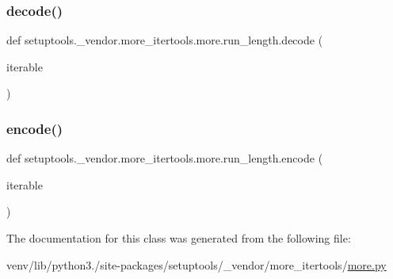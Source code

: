 \subsubsection{\texorpdfstring{decode()}{decode()}}
{\footnotesize\ttfamily def setuptools.\+\_\+vendor.\+more\+\_\+itertools.\+more.\+run\+\_\+length.\+decode (\begin{DoxyParamCaption}\item[{}]{iterable }\end{DoxyParamCaption})\hspace{0.3cm}{\ttfamily [static]}}

\mbox{\label{classsetuptools_1_1__vendor_1_1more__itertools_1_1more_1_1run__length_a4046f1d68dbcb52ce9caa17fb2d356cd}} 
\subsubsection{\texorpdfstring{encode()}{encode()}}
{\footnotesize\ttfamily def setuptools.\+\_\+vendor.\+more\+\_\+itertools.\+more.\+run\+\_\+length.\+encode (\begin{DoxyParamCaption}\item[{}]{iterable }\end{DoxyParamCaption})\hspace{0.3cm}{\ttfamily [static]}}



The documentation for this class was generated from the following file\+:\begin{DoxyCompactItemize}
\item 
venv/lib/python3./site-\/packages/setuptools/\+\_\+vendor/more\+\_\+itertools/\hyperlink{more_8py}{more.\+py}\end{DoxyCompactItemize}
